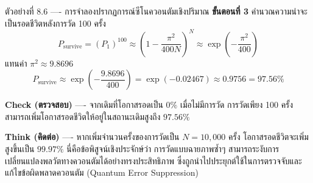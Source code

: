 \begin{psctbox}{ตัวอย่างที่ 8.6 ---- การจำลองปรากฏการณ์ซีโนควอนตัมเชิงปริมาณ}
\textbf{ขั้นตอนที่ 3} คำนวณความน่าจะเป็นรอดชีวิตหลังการวัด 100 ครั้ง
\begin{equation*}
P_{\text{survive}} = (P_1)^{100} \approx \left( 1 - \frac{\pi^2}{400 N} \right)^N \approx \exp\left( -\frac{\pi^2}{400} \right)
\end{equation*}
แทนค่า $\pi^2 \approx 9.8696$
\begin{equation*}
P_{\text{survive}} \approx \exp\left( -\frac{9.8696}{400} \right) = \exp(-0.02467) \approx 0.9756 = 97.56\%
\end{equation*}

\textbf{Check (ตรวจสอบ)} ---- จากเดิมที่โอกาสรอดเป็น $0\%$ เมื่อไม่มีการวัด การวัดเพียง 100 ครั้งสามารถเพิ่มโอกาสรอดชีวิตให้อยู่ในสถานะเดิมสูงถึง $97.56\%$

\textbf{Think (คิดต่อ)} ---- หากเพิ่มจำนวนครั้งของการวัดเป็น $N = 10,000$ ครั้ง โอกาสรอดชีวิตจะเพิ่มสูงขึ้นเป็น $99.97\%$ นี่คือข้อพิสูจน์เชิงประจักษ์ว่า การวัดแบบฉายภาพซ้ำๆ สามารถระงับการเปลี่ยนแปลงพลวัตทางควอนตัมได้อย่างทรงประสิทธิภาพ ซึ่งถูกนำไปประยุกต์ใช้ในการตรวจจับและแก้ไขข้อผิดพลาดควอนตัม (Quantum Error Suppression)
\end{psctbox}

